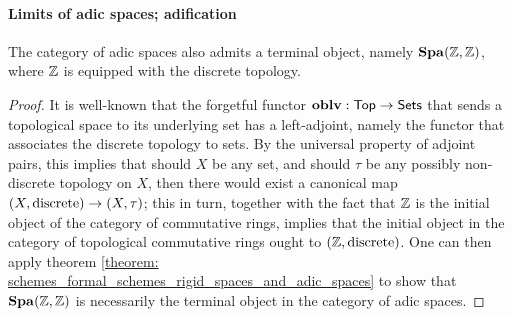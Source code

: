                 \paragraph{Limits of adic spaces; adification}
                    \begin{proposition} \label{prop: terminal_adic_space}
                        The category of adic spaces also admits a terminal object, namely $\mathbf{Spa}(\mathbb{Z}, \mathbb{Z})$, where $\mathbb{Z}$ is equipped with the discrete topology.
                    \end{proposition}
                        \begin{proof}
                            It is well-known that the forgetful functor $\mathbf{oblv}: \mathsf{Top} \to \mathsf{Sets}$ that sends a topological space to its underlying set has a left-adjoint, namely the functor that associates the discrete topology to sets. By the universal property of adjoint pairs, this implies that should $X$ be any set, and should $\tau$ be any possibly non-discrete topology on $X$, then there would exist a canonical map $(X, \mathrm{discrete}) \to (X, \tau)$; this in turn, together with the fact that $\mathbb{Z}$ is the initial object of the category of commutative rings, implies that the initial object in the category of topological commutative rings ought to $(\mathbb{Z}, \mathrm{discrete})$. One can then apply theorem \ref{theorem: schemes_formal_schemes_rigid_spaces_and_adic_spaces} to show that $\mathbf{Spa}(\mathbb{Z}, \mathbb{Z})$ is necessarily the terminal object in the category of adic spaces. 
                        \end{proof}
                
